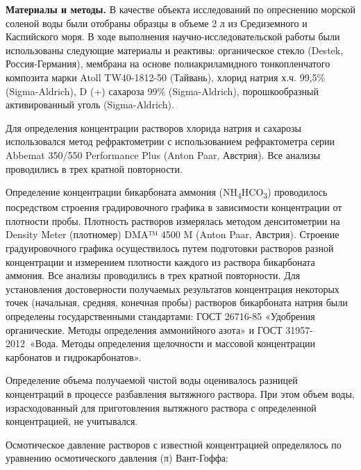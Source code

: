\begin{multicols}{2}
{\bfseries Материалы и методы.} В качестве объекта исследований по
опреснению морской соленой воды были отобраны образцы в объеме 2 л из
Средиземного и Каспийского моря. В ходе выполнения
научно-исследовательской работы были использованы следующие материалы и
реактивы: органическое стекло (Destek, Россия-Германия), мембрана на
основе полиакриламидного тонкопленчатого композита марки Atoll
TW40-1812-50 (Тайвань), хлорид натрия х.ч. 99,5\% (Sigma-Aldrich), D (+)
сахароза 99\% (Sigma-Aldrich), порошкообразный активированный уголь
(Sigma-Aldrich).

Для определения концентрации растворов хлорида натрия и сахарозы
использовался метод рефрактометрии с использованием рефрактометра серии
Abbemat 350/550 Performance Plus (Anton Paar, Австрия). Все анализы
проводились в трех кратной повторности.

Определение концентрации бикарбоната аммония
(NH\textsubscript{4}HCO\textsubscript{3}) проводилось посредством
строения градировочного графика в зависимости концентрации от плотности
пробы. Плотность растворов измерялась методом денситометрии на Density
Meter (плотномер) DMA™ 4500 M (Anton Paar, Австрия). Строение
градуировочного графика осуществилось путем подготовки растворов разной
концентрации и измерением плотности каждого из раствора бикарбоната
аммония. Все анализы проводились в трех кратной повторности. Для
установления достоверности получаемых результатов концентрация некоторых
точек (начальная, средняя, конечная пробы) растворов бикарбоната натрия
были определены государственными стандартами: ГОСТ 26716-85 «Удобрения
органические. Методы определения аммонийного азота» и ГОСТ
31957-2012~«Вода. Методы определения щелочности и массовой концентрации
карбонатов и гидрокарбонатов».

Определение объема получаемой чистой воды оценивалось разницей
концентраций в процессе разбавления вытяжного раствора. При этом объем
воды, израсходованный для приготовления вытяжного раствора с
определенной концентрацией, не учитывался.

Осмотическое давление растворов с известной концентрацией определялось
по уравнению осмотического давления (π) Вант-Гоффа:
\end{multicols}


